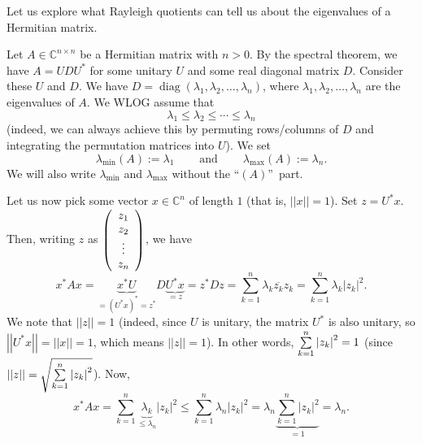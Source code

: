 \documentclass[numbers=enddot,12pt,final,onecolumn,notitlepage]{scrartcl}%
\numberwithin{exer}{subsection}
\theoremstyle{definition}
\let\sumnonlimits\sum
\renewcommand{\sum}{\sumnonlimits\limits}
\begin{document}
Let us explore what Rayleigh quotients can tell us about the eigenvalues of a
Hermitian matrix.

Let $A\in\mathbb{C}^{n\times n}$ be a Hermitian matrix with $n>0$. By the
spectral theorem, we have $A=UDU^{\ast}$ for some unitary $U$ and some real
diagonal matrix $D$. Consider these $U$ and $D$. We have
$D=\operatorname*{diag}\left(  \lambda_{1},\lambda_{2},\ldots,\lambda
_{n}\right)  $, where $\lambda_{1},\lambda_{2},\ldots,\lambda_{n}$ are the
eigenvalues of $A$. We WLOG assume that
\[
\lambda_{1}\leq\lambda_{2}\leq\cdots\leq\lambda_{n}%
\]
(indeed, we can always achieve this by permuting rows/columns of $D$ and
integrating the permutation matrices into $U$). We set%
\[
\lambda_{\min}\left(  A\right)  :=\lambda_{1}\ \ \ \ \ \ \ \ \ \ \text{and}%
\ \ \ \ \ \ \ \ \ \ \lambda_{\max}\left(  A\right)  :=\lambda_{n}.
\]
We will also write $\lambda_{\min}$ and $\lambda_{\max}$ without the
\textquotedblleft$\left(  A\right)  $\textquotedblright\ part.

Let us now pick some vector $x\in\mathbb{C}^{n}$ of length $1$ (that is,
$\left\vert \left\vert x\right\vert \right\vert =1$). Set $z=U^{\ast}x$. Then,
writing $z$ as $\left(
\begin{array}
[c]{c}%
z_{1}\\
z_{2}\\
\vdots\\
z_{n}%
\end{array}
\right)  $, we have%
\[
x^{\ast}Ax=\underbrace{x^{\ast}U}_{=\left(  U^{\ast}x\right)  ^{\ast}=z^{\ast
}}D\underbrace{U^{\ast}x}_{=z}=z^{\ast}Dz=\sum_{k=1}^{n}\lambda_{k}%
\overline{z_{k}}z_{k}=\sum_{k=1}^{n}\lambda_{k}\left\vert z_{k}\right\vert
^{2}.
\]
We note that $\left\vert \left\vert z\right\vert \right\vert =1$ (indeed,
since $U$ is unitary, the matrix $U^{\ast}$ is also unitary, so $\left\vert
\left\vert U^{\ast}x\right\vert \right\vert =\left\vert \left\vert
x\right\vert \right\vert =1$, which means $\left\vert \left\vert z\right\vert
\right\vert =1$). In other words, $\sum\limits_{k=1}^{n}\left\vert
z_{k}\right\vert ^{2}=1$ (since $\left\vert \left\vert z\right\vert
\right\vert =\sqrt{\sum\limits_{k=1}^{n}\left\vert z_{k}\right\vert ^{2}}$).
Now,%
\[
x^{\ast}Ax=\sum_{k=1}^{n}\underbrace{\lambda_{k}}_{\leq\lambda_{n}}\left\vert
z_{k}\right\vert ^{2}\leq\sum_{k=1}^{n}\lambda_{n}\left\vert z_{k}\right\vert
^{2}=\lambda_{n}\underbrace{\sum_{k=1}^{n}\left\vert z_{k}\right\vert ^{2}%
}_{=1}=\lambda_{n}.
\]
\end{document}
